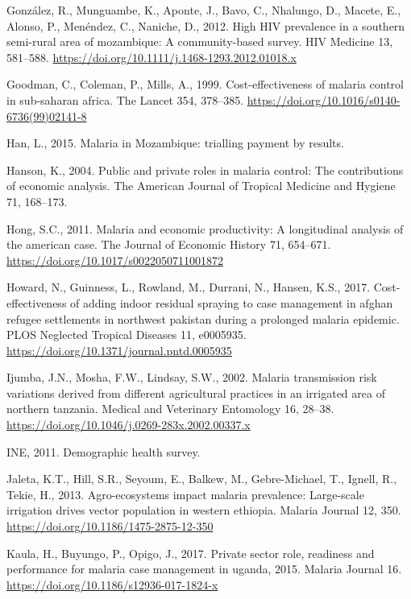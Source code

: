 \documentclass[]{article}
\begin{document}
\hypertarget{ref-Gonzlez2012}{}
González, R., Munguambe, K., Aponte, J., Bavo, C., Nhalungo, D., Macete,
E., Alonso, P., Menéndez, C., Naniche, D., 2012. High HIV prevalence in
a southern semi-rural area of mozambique: A community-based survey. HIV
Medicine 13, 581--588.
\url{https://doi.org/10.1111/j.1468-1293.2012.01018.x}

\hypertarget{ref-Goodman1999}{}
Goodman, C., Coleman, P., Mills, A., 1999. Cost-effectiveness of malaria
control in sub-saharan africa. The Lancet 354, 378--385.
\url{https://doi.org/10.1016/s0140-6736(99)02141-8}

\hypertarget{ref-Han}{}
Han, L., 2015. Malaria in Mozambique: trialling payment by results.

\hypertarget{ref-Hanson2004}{}
Hanson, K., 2004. Public and private roles in malaria control: The
contributions of economic analysis. The American Journal of Tropical
Medicine and Hygiene 71, 168--173.

\hypertarget{ref-Hong2011}{}
Hong, S.C., 2011. Malaria and economic productivity: A longitudinal
analysis of the american case. The Journal of Economic History 71,
654--671. \url{https://doi.org/10.1017/s0022050711001872}

\hypertarget{ref-Howard_2017}{}
Howard, N., Guinness, L., Rowland, M., Durrani, N., Hansen, K.S., 2017.
Cost-effectiveness of adding indoor residual spraying to case management
in afghan refugee settlements in northwest pakistan during a prolonged
malaria epidemic. PLOS Neglected Tropical Diseases 11, e0005935.
\url{https://doi.org/10.1371/journal.pntd.0005935}

\hypertarget{ref-Ijumba2002}{}
Ijumba, J.N., Mosha, F.W., Lindsay, S.W., 2002. Malaria transmission
risk variations derived from different agricultural practices in an
irrigated area of northern tanzania. Medical and Veterinary Entomology
16, 28--38. \url{https://doi.org/10.1046/j.0269-283x.2002.00337.x}

\hypertarget{ref-estatistica2009}{}
INE, 2011. Demographic health survey.

\hypertarget{ref-Jaleta2013}{}
Jaleta, K.T., Hill, S.R., Seyoum, E., Balkew, M., Gebre-Michael, T.,
Ignell, R., Tekie, H., 2013. Agro-ecosystems impact malaria prevalence:
Large-scale irrigation drives vector population in western ethiopia.
Malaria Journal 12, 350. \url{https://doi.org/10.1186/1475-2875-12-350}

\hypertarget{ref-Kaula_2017}{}
Kaula, H., Buyungo, P., Opigo, J., 2017. Private sector role, readiness
and performance for malaria case management in uganda, 2015. Malaria
Journal 16. \url{https://doi.org/10.1186/s12936-017-1824-x}
\end{document}
